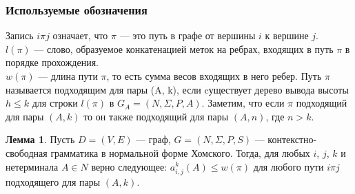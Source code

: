 \documentclass[14pt]{matmex-diploma}
\theoremstyle{definition}
\newtheorem{lemma}{Лемма}
\begin{document}
       \subsubsection{Используемые обозначения}
           Запись $i\pi j$ означает, что $\pi$ --- это путь в графе от вершины $i$ к вершине $j$.\\
           $l(\pi)$ --- слово, образуемое конкатенацией меток на ребрах, входящих в путь $\pi$ в порядке прохождения.\\
           $w(\pi)$ --- длина пути $\pi$, то есть сумма весов входящих в него ребер.
           Путь $\pi$ называется подходящим для пары (A, k), если cуществует дерево вывода высоты $h\le k$ для строки $l(\pi)$ в $G_A=(N,\Sigma, P, A)$. Заметим, что если $\pi$ подходящий для пары $(A, k)$ то он также подходящий для пары $(A, n)$, где $n > k$.
       \begin{lemma}
       \label{le_any}
           Пусть $D=(V,E)$ --- граф, $G=(N,\Sigma, P, S)$ --- контекстно-свободная грамматика в нормальной форме Хомского. Тогда, для любых $i$, $j$, $k$ и нетерминала $A\in N$
       верно следующее: $a^k_{i,j}(A) \le w(\pi)$ для любого пути $i\pi j$ подходящего для пары $(A, k)$.
       \end{lemma}
\end{document}
